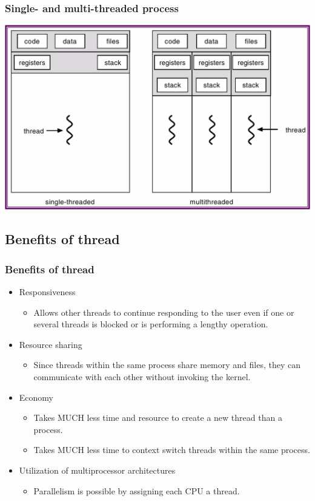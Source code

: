 \documentclass[CJKutf8,xcolor=pdftex,dvipsnames,table]{beamer}
\begin{document}
\begin{CJK*}{UTF8}{song}
  \begin{frame}
  \frametitle{Single- and multi-threaded process} \pause
  \begin{center}
    \includegraphics[scale=0.6]{v6f5-1}
  \end{center}
  \end{frame}

  \subsection{Benefits of thread}

  \begin{frame}
  \frametitle{Benefits of thread} \pause
  \begin{itemize}
  \item{Responsiveness} \pause
    \begin{itemize}
    \item{Allows other threads to continue responding to the user even if one or several threads is blocked or is performing a lengthy operation.} \pause
    \end{itemize}
  \item{Resource sharing} \pause
    \begin{itemize}
    \item{Since threads within the same process share memory and files, they can communicate with each other without invoking the kernel.} \pause
    \end{itemize}
  \item{Economy} \pause
    \begin{itemize}
    \item{Takes MUCH less time and resource to create a new thread than a process.} \pause
    \item{Takes MUCH less time to context switch threads within the same process.} \pause
    \end{itemize}
  \item{Utilization of multiprocessor architectures} \pause
    \begin{itemize}
    \item{Parallelism is possible by assigning each CPU a thread.}
    \end{itemize}
  \end{itemize}
  \end{frame}


\end{CJK*}
\end{document}
